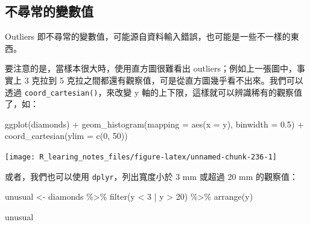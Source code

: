 \documentclass[
]{book}
\newenvironment{Shaded}{\begin{snugshade}}{\end{snugshade}}
\newcommand{\AttributeTok}[1]{\textcolor[rgb]{0.77,0.63,0.00}{#1}}
\newcommand{\DecValTok}[1]{\textcolor[rgb]{0.00,0.00,0.81}{#1}}
\newcommand{\FloatTok}[1]{\textcolor[rgb]{0.00,0.00,0.81}{#1}}
\newcommand{\FunctionTok}[1]{\textcolor[rgb]{0.00,0.00,0.00}{#1}}
\newcommand{\NormalTok}[1]{#1}
\newcommand{\OtherTok}[1]{\textcolor[rgb]{0.56,0.35,0.01}{#1}}
\newcommand{\SpecialCharTok}[1]{\textcolor[rgb]{0.00,0.00,0.00}{#1}}
\theoremstyle{definition}
\theoremstyle{remark}
\begin{document}
\hypertarget{ux4e0dux5c0bux5e38ux7684ux8b8aux6578ux503c}{%
\subsection{不尋常的變數值}\label{ux4e0dux5c0bux5e38ux7684ux8b8aux6578ux503c}}

Outliers 即不尋常的變數值，可能源自資料輸入錯誤，也可能是一些不一樣的東西。

要注意的是，當樣本很大時，使用直方圖很難看出 outliers；例如上一張圖中，事實上 3 克拉到 5 克拉之間都還有觀察值，可是從直方圖幾乎看不出來。我們可以透過 \texttt{coord\_cartesian()}，來改變 y 軸的上下限，這樣就可以辨識稀有的觀察值了，如：

\begin{Shaded}
\begin{Highlighting}[]
\FunctionTok{ggplot}\NormalTok{(diamonds) }\SpecialCharTok{+}
  \FunctionTok{geom\_histogram}\NormalTok{(}\AttributeTok{mapping =} \FunctionTok{aes}\NormalTok{(}\AttributeTok{x =}\NormalTok{ y), }\AttributeTok{binwidth =} \FloatTok{0.5}\NormalTok{) }\SpecialCharTok{+}
  \FunctionTok{coord\_cartesian}\NormalTok{(}\AttributeTok{ylim =} \FunctionTok{c}\NormalTok{(}\DecValTok{0}\NormalTok{, }\DecValTok{50}\NormalTok{))}
\end{Highlighting}
\end{Shaded}

\begin{center}\texttt{[image: R\_learing\_notes\_files/figure-latex/unnamed-chunk-236-1]} \end{center}

或者，我們也可以使用 \texttt{dplyr}，列出寬度小於 3 mm 或超過 20 mm 的觀察值：

\begin{Shaded}
\begin{Highlighting}[]
\NormalTok{unusual }\OtherTok{\textless{}{-}}\NormalTok{ diamonds }\SpecialCharTok{\%\textgreater{}\%}
  \FunctionTok{filter}\NormalTok{(y }\SpecialCharTok{\textless{}} \DecValTok{3} \SpecialCharTok{|}\NormalTok{ y }\SpecialCharTok{\textgreater{}} \DecValTok{20}\NormalTok{) }\SpecialCharTok{\%\textgreater{}\%}
  \FunctionTok{arrange}\NormalTok{(y)}

\NormalTok{unusual}
\end{Highlighting}
\end{Shaded}
\end{document}
